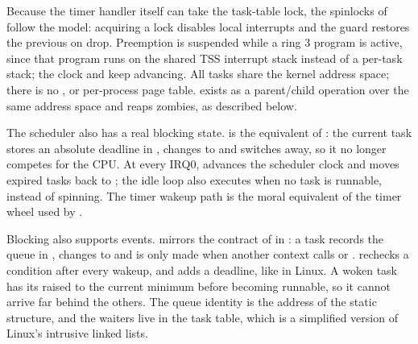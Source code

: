 Because the timer handler itself can take the task-table lock, the spinlocks
of  follow the  model: acquiring a lock disables
local interrupts and the guard restores the previous  on drop.
Preemption is suspended while a ring 3 program is active, since that program
runs on the shared TSS interrupt stack instead of a per-task stack; the clock
and  keep advancing. All tasks share the kernel address space;
there is no ,  or per-process page table. 
exists as a parent/child operation over the same address space and reaps
zombies, as described below.

The scheduler also has a real blocking state.  is the
equivalent of : the current task stores an absolute
deadline in , changes to  and switches away, so it
no longer competes for the CPU. At every IRQ0,  advances the
scheduler clock and moves expired tasks back to ; the idle loop
also executes  when no task is runnable, instead of spinning. The
timer wakeup path is the moral equivalent of the timer wheel used by
.

Blocking also supports events.  mirrors the contract of
 in : a task records the
queue in , changes to  and is only made
 when another context calls  or
.  rechecks a condition after every
wakeup, and  adds a deadline, like
 in Linux. A woken task has its 
raised to the current minimum before becoming runnable, so it cannot arrive
far behind the others. The queue identity is the address of the static
structure, and the waiters live in the task table, which is a simplified
version of Linux's intrusive linked lists.

